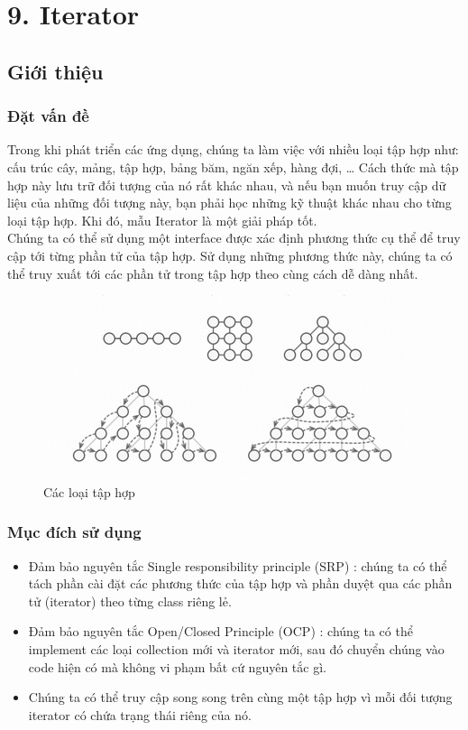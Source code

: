 \chapter{9. Iterator}
\section{Giới thiệu}
\subsection{Đặt vấn đề}
Trong khi phát triển các ứng dụng, chúng ta làm việc với nhiều loại tập hợp như: cấu trúc cây, mảng, tập hợp, bảng băm, ngăn xếp, hàng đợi, … Cách thức mà tập hợp này lưu trữ đối tượng của nó rất khác nhau, và nếu bạn muốn truy cập dữ liệu của những đối tượng này, bạn phải học những kỹ thuật khác nhau cho từng loại tập hợp. Khi đó, mẫu Iterator là một giải pháp tốt.\\
Chúng ta có thể sử dụng một interface được xác định phương thức cụ thể để truy cập tới từng phần tử của tập hợp. Sử dụng những phương thức này, chúng ta có thể truy xuất tới các phần tử trong tập hợp theo cùng cách dễ dàng nhất.

\begin{figure}[!htb]
    \centering
    \includegraphics[width=\textwidth]{fig/Iterator/iterator_problem.png}
    \caption{Các loại tập hợp}
    \label{fig:iterator_problem}
\end{figure}

\subsection{Mục đích sử dụng}
\begin{itemize}
    \item Đảm bảo nguyên tắc Single responsibility principle (SRP) : chúng ta có thể tách phần cài đặt các phương thức của tập hợp và phần duyệt qua các phần tử (iterator) theo từng class riêng lẻ.
    \item Đảm bảo nguyên tắc Open/Closed Principle (OCP) : chúng ta có thể implement các loại collection mới và iterator mới, sau đó chuyển chúng vào code hiện có mà không vi phạm bất cứ nguyên tắc gì.
    \item Chúng ta có thể truy cập song song trên cùng một tập hợp vì mỗi đối tượng iterator có chứa trạng thái riêng của nó.
\end{itemize}


